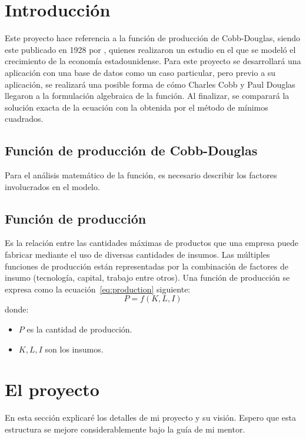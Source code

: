 \section{Introducción}

Este proyecto hace referencia a la función de producción de Cobb-Douglas, siendo este publicado en \cite{Douglas1976} 1928 por \citeauthor{Douglas1976}, quienes realizaron un estudio en el que se modeló el crecimiento de la economía estadounidense. Para este proyecto se desarrollará una aplicación con una base de datos como un caso particular, pero previo a su aplicación, se realizará una posible forma de cómo Charles Cobb y Paul Douglas llegaron a la formulación algebraica de la función. Al finalizar, se comparará la solución exacta de la ecuación con la obtenida por el método de mínimos cuadrados.

\subsection{Función de producción de Cobb-Douglas}

Para el análisis matemático de la función, es necesario describir los factores involucrados en el modelo.

\subsection{Función de producción}

Es la relación entre las cantidades máximas de productos que una empresa puede fabricar mediante el uso de diversas cantidades de insumos. Las múltiples funciones de producción están representadas por la combinación de factores de insumo (tecnología, capital, trabajo entre otros). Una función de producción se expresa como la ecuación~\eqref{eq:production} siguiente:
\begin{equation}\label{eq:production}
P=f(K,L,I)
\end{equation}
donde:
\begin{itemize}
	\item $P$ es la cantidad de producción.
	\item $K,L,I$ son los insumos.
\end{itemize}

\section{El proyecto}

En esta sección explicaré los detalles de mi proyecto y su visión. Espero que esta estructura se mejore considerablemente bajo la guía de mi mentor.

